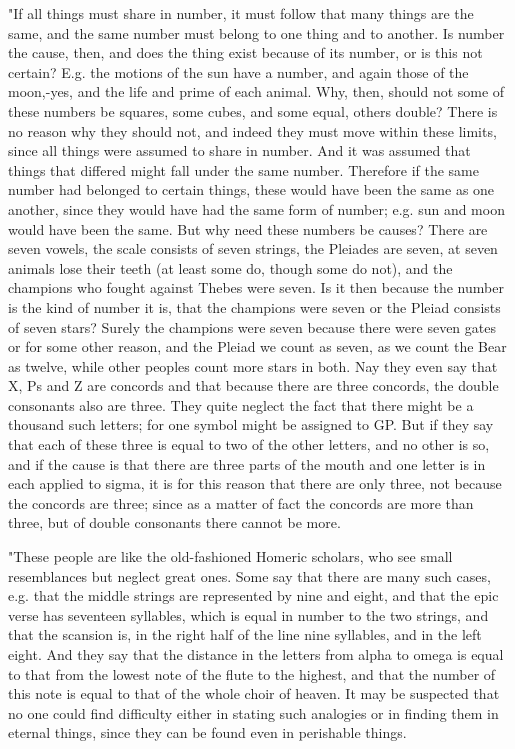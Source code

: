 "If all things must share in number, it must follow that many things
are the same, and the same number must belong to one thing and to
another. Is number the cause, then, and does the thing exist because
of its number, or is this not certain? E.g. the motions of the sun
have a number, and again those of the moon,-yes, and the life and
prime of each animal. Why, then, should not some of these numbers
be squares, some cubes, and some equal, others double? There is no
reason why they should not, and indeed they must move within these
limits, since all things were assumed to share in number. And it was
assumed that things that differed might fall under the same number.
Therefore if the same number had belonged to certain things, these
would have been the same as one another, since they would have had
the same form of number; e.g. sun and moon would have been the same.
But why need these numbers be causes? There are seven vowels, the
scale consists of seven strings, the Pleiades are seven, at seven
animals lose their teeth (at least some do, though some do not), and
the champions who fought against Thebes were seven. Is it then because
the number is the kind of number it is, that the champions were seven
or the Pleiad consists of seven stars? Surely the champions were seven
because there were seven gates or for some other reason, and the Pleiad
we count as seven, as we count the Bear as twelve, while other peoples
count more stars in both. Nay they even say that X, Ps and Z are concords
and that because there are three concords, the double consonants also
are three. They quite neglect the fact that there might be a thousand
such letters; for one symbol might be assigned to GP. But if they
say that each of these three is equal to two of the other letters,
and no other is so, and if the cause is that there are three parts
of the mouth and one letter is in each applied to sigma, it is for
this reason that there are only three, not because the concords are
three; since as a matter of fact the concords are more than three,
but of double consonants there cannot be more. 

"These people are like the old-fashioned Homeric scholars, who see
small resemblances but neglect great ones. Some say that there are
many such cases, e.g. that the middle strings are represented by nine
and eight, and that the epic verse has seventeen syllables, which
is equal in number to the two strings, and that the scansion is, in
the right half of the line nine syllables, and in the left eight.
And they say that the distance in the letters from alpha to omega
is equal to that from the lowest note of the flute to the highest,
and that the number of this note is equal to that of the whole choir
of heaven. It may be suspected that no one could find difficulty either
in stating such analogies or in finding them in eternal things, since
they can be found even in perishable things. 

